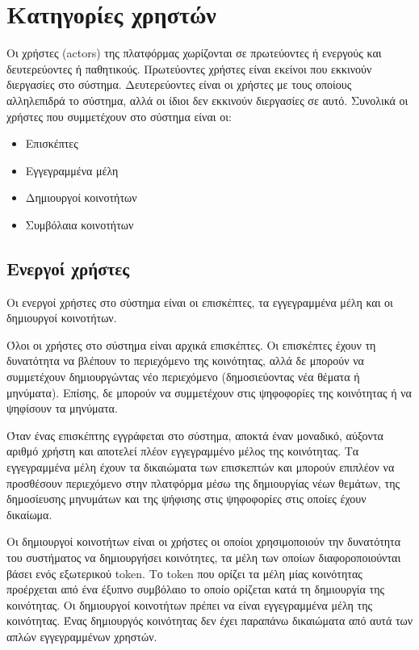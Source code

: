 \section{Κατηγορίες χρηστών} \label{section:3-4-user-categories}

Οι χρήστες (actors) της πλατφόρμας χωρίζονται σε πρωτεύοντες ή ενεργούς και δευτερεύοντες ή παθητικούς. Πρωτεύοντες χρήστες είναι εκείνοι που εκκινούν διεργασίες στο σύστημα. Δευτερεύοντες είναι οι χρήστες με τους οποίους αλληλεπιδρά το σύστημα, αλλά οι ίδιοι δεν εκκινούν διεργασίες σε αυτό. Συνολικά οι χρήστες που συμμετέχουν στο σύστημα είναι οι:

\begin{itemize}
    \item Επισκέπτες
    \item Εγγεγραμμένα μέλη
    \item Δημιουργοί κοινοτήτων %
    \item Συμβόλαια κοινοτήτων
\end{itemize}

\subsection{Ενεργοί χρήστες}

Οι ενεργοί χρήστες στο σύστημα είναι οι επισκέπτες, τα εγγεγραμμένα μέλη και οι δημιουργοί κοινοτήτων.

Όλοι οι χρήστες στο σύστημα είναι αρχικά επισκέπτες. Οι επισκέπτες έχουν τη δυνατότητα να βλέπουν το περιεχόμενο της κοινότητας, αλλά δε μπορούν να συμμετέχουν δημιουργώντας νέο περιεχόμενο (δημοσιεύοντας νέα θέματα ή μηνύματα). Επίσης, δε μπορούν να συμμετέχουν στις ψηφοφορίες της κοινότητας ή να ψηφίσουν τα μηνύματα.

Όταν ένας επισκέπτης εγγράφεται στο σύστημα, αποκτά έναν μοναδικό, αύξοντα αριθμό χρήστη και αποτελεί πλέον εγγεγραμμένο μέλος της κοινότητας. Τα εγγεγραμμένα μέλη έχουν τα δικαιώματα των επισκεπτών και μπορούν επιπλέον να προσθέσουν περιεχόμενο στην πλατφόρμα μέσω της δημιουργίας νέων θεμάτων, της δημοσίευσης μηνυμάτων και της ψήφισης στις ψηφοφορίες στις οποίες έχουν δικαίωμα.

Οι δημιουργοί κοινοτήτων είναι οι χρήστες οι οποίοι χρησιμοποιούν την δυνατότητα του συστήματος να δημιουργήσει κοινότητες, τα μέλη των οποίων διαφοροποιούνται βάσει ενός εξωτερικού token. Το token που ορίζει τα μέλη μίας κοινότητας προέρχεται από ένα έξυπνο συμβόλαιο το οποίο ορίζεται κατά τη δημιουργία της κοινότητας. Οι δημιουργοί κοινοτήτων πρέπει να είναι εγγεγραμμένα μέλη της κοινότητας. Ένας δημιουργός κοινότητας δεν έχει παραπάνω δικαιώματα από αυτά των απλών εγγεγραμμένων χρηστών.


